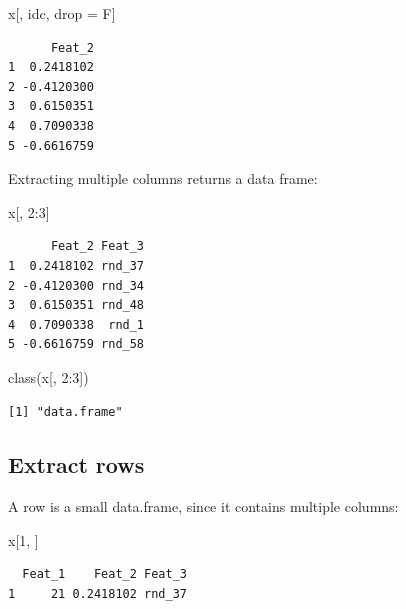 \documentclass[
]{book}
\newenvironment{Shaded}{\begin{snugshade}}{\end{snugshade}}
\newcommand{\DecValTok}[1]{\textcolor[rgb]{0.00,0.00,0.81}{#1}}
\newcommand{\FunctionTok}[1]{\textcolor[rgb]{0.00,0.00,0.00}{#1}}
\newcommand{\NormalTok}[1]{#1}
\newcommand{\OtherTok}[1]{\textcolor[rgb]{0.56,0.35,0.01}{#1}}
\newcommand{\SpecialCharTok}[1]{\textcolor[rgb]{0.00,0.00,0.00}{#1}}
\begin{document}
\begin{Shaded}
\begin{Highlighting}[]
\NormalTok{x[, idc, drop }\OtherTok{=}\NormalTok{ F]}
\end{Highlighting}
\end{Shaded}

\begin{verbatim}
      Feat_2
1  0.2418102
2 -0.4120300
3  0.6150351
4  0.7090338
5 -0.6616759
\end{verbatim}

Extracting multiple columns returns a data frame:

\begin{Shaded}
\begin{Highlighting}[]
\NormalTok{x[, }\DecValTok{2}\SpecialCharTok{:}\DecValTok{3}\NormalTok{]}
\end{Highlighting}
\end{Shaded}

\begin{verbatim}
      Feat_2 Feat_3
1  0.2418102 rnd_37
2 -0.4120300 rnd_34
3  0.6150351 rnd_48
4  0.7090338  rnd_1
5 -0.6616759 rnd_58
\end{verbatim}

\begin{Shaded}
\begin{Highlighting}[]
\FunctionTok{class}\NormalTok{(x[, }\DecValTok{2}\SpecialCharTok{:}\DecValTok{3}\NormalTok{])}
\end{Highlighting}
\end{Shaded}

\begin{verbatim}
[1] "data.frame"
\end{verbatim}

\hypertarget{extract-rows}{%
\subsection{Extract rows}\label{extract-rows}}

A row is a small data.frame, since it contains multiple columns:

\begin{Shaded}
\begin{Highlighting}[]
\NormalTok{x[}\DecValTok{1}\NormalTok{, ]}
\end{Highlighting}
\end{Shaded}

\begin{verbatim}
  Feat_1    Feat_2 Feat_3
1     21 0.2418102 rnd_37
\end{verbatim}
\end{document}
